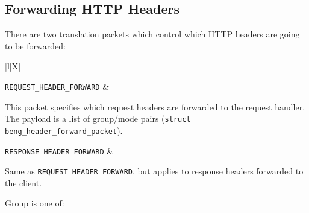 \documentclass[a4paper,12pt]{article}
\begin{document}
\subsection{Forwarding HTTP Headers}
\label{tfwdheader}

There are two translation packets which control which HTTP headers are
going to be forwarded:

\begin{longtabu*}{|l|X|}
\hline

\verb|REQUEST_HEADER_FORWARD| &

This packet specifies which request headers are forwarded to the
request handler.  The payload is a list of group/mode pairs
(\texttt{struct beng\_header\_forward\_packet}). \\

\hline

\verb|RESPONSE_HEADER_FORWARD| &

Same as \verb|REQUEST_HEADER_FORWARD|, but applies to response
headers forwarded to the client. \\

\hline
\end{longtabu*}

Group is one of:
\end{document}
